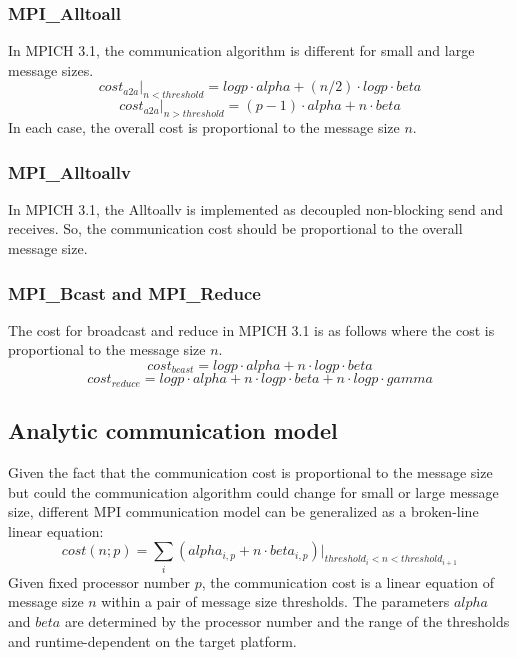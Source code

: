 \subsubsection{MPI\_Alltoall}
In MPICH 3.1, the communication algorithm is different for small and large message sizes.
\begin{equation}
cost_{a2a}|_{n<threshold} = log p\cdot alpha + (n/2)\cdot log p\cdot beta
\end{equation}
\begin{equation}
cost_{a2a}|_{n>threshold} = (p-1)\cdot alpha + n\cdot beta
\end{equation}
In each case, the overall cost is proportional to the message size $n$.

\subsubsection{MPI\_Alltoallv}
In MPICH 3.1, the Alltoallv is implemented as decoupled non-blocking send and receives.
So, the communication cost should be proportional to the overall message size.

\subsubsection{MPI\_Bcast and MPI\_Reduce}
The cost for broadcast and reduce in MPICH 3.1 is as follows where the cost is proportional to the message size $n$.
\begin{equation}
cost_{bcast} = log p\cdot alpha + n\cdot log p\cdot beta
\end{equation}
\begin{equation}
cost_{reduce} = log p\cdot alpha + n\cdot log p\cdot beta + n\cdot log p\cdot gamma
\end{equation}


\subsection{Analytic communication model}
Given the fact that the communication cost is proportional to the message size
but could the communication algorithm could change for small or large message size,
different MPI communication model can be generalized
as a broken-line linear equation:
\begin{equation}
cost(n;p) = \sum_i(alpha_{i,p} + n\cdot beta_{i,p})|_{threshold_i<n<threshold_{i+1}}
\end{equation}
Given fixed processor number $p$, the communication cost is a linear equation of
message size $n$ within a pair of message size thresholds.
The parameters $alpha$ and $beta$ are determined by the processor number and the range of the thresholds
and runtime-dependent on the target platform.

